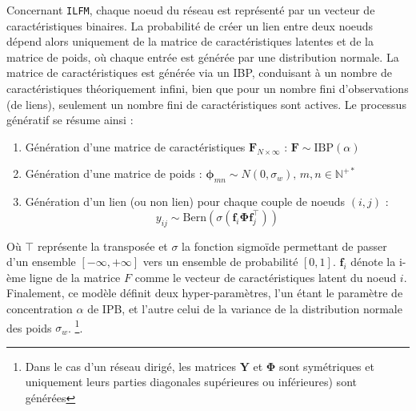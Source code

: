 \documentclass[french]{hermes-journal}
\newcommand{\ilfm}{\texttt{ILFM}}
\newcommand{\IBP}{\mathrm{IBP}}
\newcommand{\mat}[1]{\bm{#1}}
\begin{document}
Concernant \ilfm, chaque noeud du réseau est représenté par un vecteur de caractéristiques binaires. La probabilité de créer un lien entre deux noeuds dépend alors uniquement de la matrice de caractéristiques latentes et de la matrice  de poids, où chaque entrée est générée par une distribution normale. La matrice de caractéristiques est générée via un IBP, conduisant à un nombre de caractéristiques théoriquement infini, bien que pour un nombre fini d'observations (de liens), seulement un nombre fini de caractéristiques sont actives. Le processus génératif se résume ainsi :
\begin{enumerate}
\item Génération d'une matrice de caractéristiques $\mat{F}_{N \times \infty}$ : $\mat{F} \sim \IBP(\alpha)$
\item Génération d'une matrice de poids : $\mat{\phi}_{mn} \sim N(0, \sigma_w), \, m,n \in \mathbb{N}^{+*}$
\item Génération d'un lien (ou non lien) pour chaque couple de noeuds $(i,j)$ : 
\begin{equation*}
y_{ij} \sim \mathrm{Bern}(\sigma(\mat{f}_{i} \mat{\Phi} \mat{f}_{j}^\top))
\label{eq:link-ilfm}
\end{equation*}
\end{enumerate}
%

Où $\top$ représente la transposée et $\sigma$ la fonction sigmoïde permettant de passer d'un ensemble $[-\infty, +\infty]$ vers un ensemble de probabilité $[0,1]$.  $\mat{f}_{i}$ dénote la i-ème ligne de la matrice $F$ comme le vecteur de caractéristiques latent du noeud $i$. Finalement, ce modèle définit deux hyper-paramètres, l'un étant le paramètre de concentration $\alpha$ de IPB, et l'autre celui de la variance de la distribution normale des poids $\sigma_w$. \footnote{Dans le cas d'un réseau dirigé, les matrices $\mat{Y}$ et $\mat{\Phi}$ sont symétriques et uniquement leurs parties diagonales supérieures ou inférieures) sont générées}. ~\\
\end{document}
